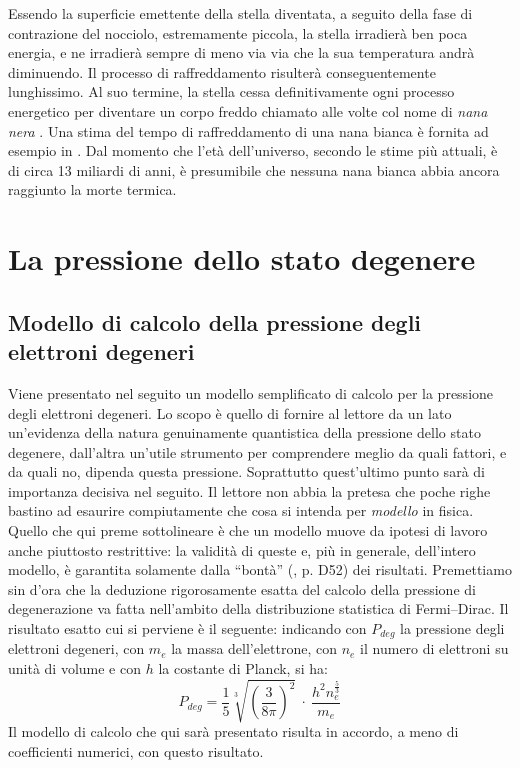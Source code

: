 \par
Essendo la superficie emettente della stella diventata, a seguito della fase di contrazione del nocciolo, estremamente piccola, la stella irradier\`{a} ben poca energia, e ne irradier\`{a} sempre di meno via via che la sua temperatura andr\`{a} diminuendo.
Il processo di raffreddamento risulter\`{a} conseguentemente lunghissimo.
Al suo termine, la stella cessa definitivamente ogni processo energetico per diventare un corpo freddo chiamato alle volte col nome di \emph{nana nera} \Cite{caf}.
Una stima del tempo di raffreddamento di una nana bianca è fornita ad esempio in \Cite{rosino}.
Dal momento che l'et\`{a} dell'universo, secondo le stime più attuali, è di circa 13 miliardi di anni, è presumibile che nessuna nana bianca abbia ancora raggiunto la morte termica.
\section{La pressione dello stato degenere}\label{degenere}
\subsection{Modello di calcolo della pressione degli elettroni degeneri}
Viene presentato nel seguito un modello semplificato di calcolo per la pressione degli elettroni degeneri. Lo scopo è quello di fornire al lettore da un lato un'evidenza della natura genuinamente quantistica della pressione dello stato degenere, dall'altra un'utile strumento per comprendere meglio da quali fattori, e da quali no, dipenda questa pressione. Soprattutto quest'ultimo punto sar\`{a} di importanza decisiva nel seguito. Il lettore non abbia la pretesa che poche righe bastino ad esaurire compiutamente che cosa si intenda per \emph{modello} in fisica. Quello che qui preme sottolineare è che un modello muove da ipotesi di lavoro anche piuttosto restrittive: la validit\`{a} di queste e, più in generale, dell'intero modello, è garantita solamente dalla ``bont\`{a}'' (\Cite{caf}, p. D52) dei risultati.
Premettiamo sin d'ora che la deduzione rigorosamente esatta del calcolo della pressione di degenerazione va fatta nell'ambito della distribuzione statistica di Fermi--Dirac.
Il risultato esatto cui si perviene è il seguente: indicando con $P_{deg}$ la pressione degli elettroni degeneri, con $m_{e}$ la massa dell'elettrone, con $n_{e}$ il numero di elettroni su unit\`{a} di volume e con $h$ la costante di Planck, si ha:
\begin{equation}\label{pesatta}
P_{deg}=\frac{1}{5} \sqrt[3]{\left( \frac{3}{8\pi} \right) ^{2}} \ \cdot \ \frac{h^{2}n_{e}^{\frac{5}{3}}}{m_{e}}
\end{equation}
Il modello di calcolo che qui sar\`{a} presentato risulta in accordo, a meno di coefficienti numerici,  con questo risultato.
\par

